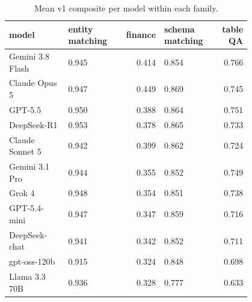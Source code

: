 \begin{table}[htbp]
\centering\scriptsize
\caption{Mean v1 composite per model within each family.}
\label{tab:family_scores}
\setlength{\tabcolsep}{3pt}
\begin{tabular}{p{0.278\linewidth}p{0.261\linewidth}rp{0.261\linewidth}r}
\toprule
model & entity matching & finance & schema matching & table QA \\
\midrule
Gemini 3.8 Flash & 0.945 & 0.414 & 0.854 & 0.766 \\
Claude Opus 5 & 0.947 & 0.449 & 0.869 & 0.745 \\
GPT-5.5 & 0.950 & 0.388 & 0.864 & 0.751 \\
DeepSeek-R1 & 0.953 & 0.378 & 0.865 & 0.733 \\
Claude Sonnet 5 & 0.942 & 0.399 & 0.862 & 0.724 \\
Gemini 3.1 Pro & 0.944 & 0.355 & 0.852 & 0.749 \\
Grok 4 & 0.948 & 0.354 & 0.851 & 0.738 \\
GPT-5.4-mini & 0.947 & 0.347 & 0.859 & 0.716 \\
DeepSeek-chat & 0.941 & 0.342 & 0.852 & 0.711 \\
gpt-oss-120b & 0.915 & 0.324 & 0.848 & 0.698 \\
Llama 3.3 70B & 0.936 & 0.328 & 0.777 & 0.633 \\
\bottomrule
\end{tabular}
\end{table}
